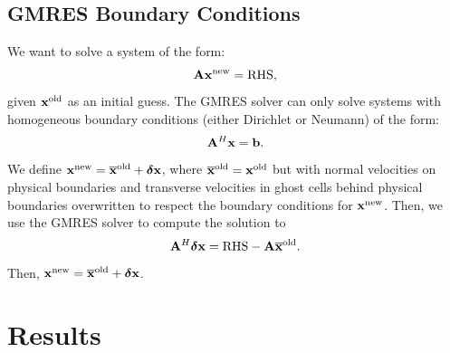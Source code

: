 \documentclass[final]{siamltex}
\def\Ab {{\bf A}}
\def\bb {{\bf b}}
\def\xb {{\bf x}}
\def\deltab {\boldsymbol{\delta}}
\begin{document}
\subsection{GMRES Boundary Conditions}
We want to solve a system of the form:
\begin{equation}
\Ab\xb^{\rm new} = {\rm RHS},
\end{equation}
given $\xb^{\rm old}$ as an initial guess.  The GMRES solver can only solve
systems with homogeneous boundary conditions (either Dirichlet or Neumann) of the
form:
\begin{equation}
\Ab^H\xb = \bb.
\end{equation}
We define $\xb^{\rm new} = \overline\xb^{\rm old} + \deltab\xb$, where 
$\overline\xb^{\rm old} = \xb^{\rm old}$ but with normal velocities on physical boundaries
and transverse velocities in ghost cells behind physical boundaries overwritten
to respect the boundary conditions for $\xb^{\rm new}$.
Then, we use the GMRES solver to compute the solution to
\begin{equation}
\Ab^H\deltab\xb = {\rm RHS} - \Ab\overline\xb^{\rm old}.
\end{equation}
Then, $\xb^{\rm new} = \overline\xb^{\rm old} + \deltab\xb$.

\section{Results}
\end{document}
